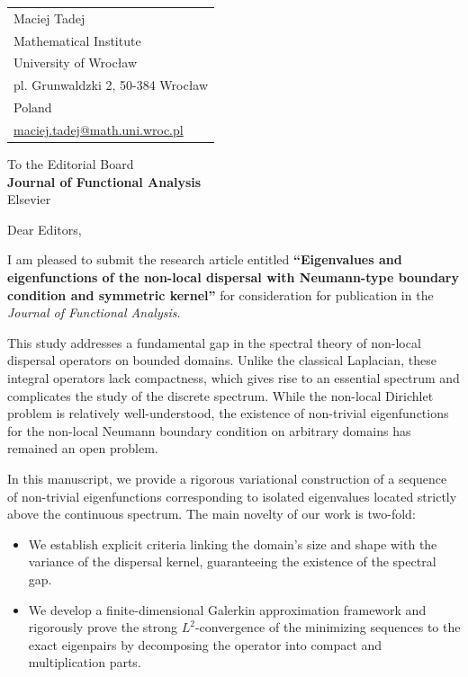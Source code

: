 \documentclass[11pt, a4paper]{article}
\begin{document}
\noindent
\begin{tabular}{@{}l}
Maciej Tadej \\
Mathematical Institute \\
University of Wrocław \\
pl. Grunwaldzki 2, 50-384 Wrocław \\
Poland \\
\href{mailto:maciej.tadej@math.uni.wroc.pl}{maciej.tadej@math.uni.wroc.pl}
\end{tabular}

\vspace{2em}

\noindent
To the Editorial Board \\
\textbf{Journal of Functional Analysis} \\
Elsevier

\vspace{2em}

\noindent
Dear Editors,

\vspace{1em}

\noindent
I am pleased to submit the research article entitled \textbf{“Eigenvalues and eigenfunctions of the non-local dispersal with Neumann-type boundary condition and symmetric kernel”} for consideration for publication in the \textit{Journal of Functional Analysis}.

This study addresses a fundamental gap in the spectral theory of non-local dispersal operators on bounded domains. Unlike the classical Laplacian, these integral operators lack compactness, which gives rise to an essential spectrum and complicates the study of the discrete spectrum. While the non-local Dirichlet problem is relatively well-understood, the existence of non-trivial eigenfunctions for the non-local Neumann boundary condition on arbitrary domains has remained an open problem.

In this manuscript, we provide a rigorous variational construction of a sequence of non-trivial eigenfunctions corresponding to isolated eigenvalues located strictly above the continuous spectrum. The main novelty of our work is two-fold:
\begin{itemize}
    \item We establish explicit criteria linking the domain's size and shape with the variance of the dispersal kernel, guaranteeing the existence of the spectral gap.
    \item We develop a finite-dimensional Galerkin approximation framework and rigorously prove the strong $L^2$-convergence of the minimizing sequences to the exact eigenpairs by decomposing the operator into compact and multiplication parts.
\end{itemize}
\end{document}
